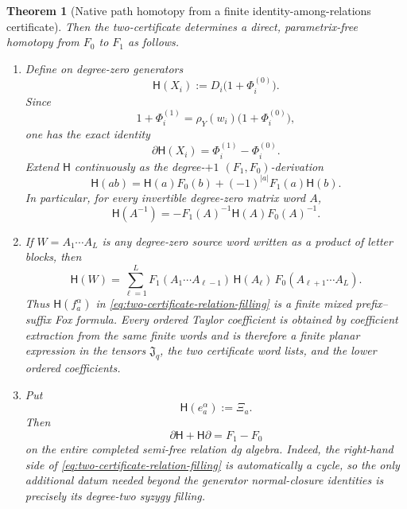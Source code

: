 \documentclass[11pt]{article}
\newtheorem{theorem}{Theorem}[section]
\theoremstyle{definition}
\begin{document}
\begin{theorem}[Native path homotopy from a finite identity-among-relations certificate]
Then the two-certificate determines a direct, parametrix-free homotopy from
$F_0$ to $F_1$ as follows.
\begin{enumerate}[label=\textnormal{(\roman*)}]
\item Define on degree-zero generators
\begin{equation}\label{eq:native-generator-homotopy}
 \boxed{
 \mathsf H(X_i):=D_i\bigl(1+\Phi_i^{(0)}\bigr).
 }
\end{equation}
Since
\[
 1+\Phi_i^{(1)}
 =\rho_Y(w_i)\bigl(1+\Phi_i^{(0)}\bigr),
\]
one has the exact identity
\begin{equation}\label{eq:native-generator-homotopy-boundary}
 \partial\mathsf H(X_i)=\Phi_i^{(1)}-\Phi_i^{(0)}.
\end{equation}
Extend $\mathsf H$ continuously as the degree-$+1$
$(F_1,F_0)$-derivation
\begin{equation}\label{eq:twisted-derivation-leibniz}
 \mathsf H(ab)
 =\mathsf H(a)F_0(b)+(-1)^{|a|}F_1(a)\mathsf H(b).
\end{equation}
In particular, for every invertible degree-zero matrix word $A$,
\begin{equation}\label{eq:twisted-derivation-inverse}
 \mathsf H(A^{-1})
 =-F_1(A)^{-1}\mathsf H(A)F_0(A)^{-1}.
\end{equation}

\item If $W=A_1\cdots A_L$ is any degree-zero source word written as a
product of letter blocks, then
\begin{equation}\label{eq:mixed-fox-homotopy-word}
 \boxed{
 \mathsf H(W)
 =\sum_{\ell=1}^{L}
 F_1(A_1\cdots A_{\ell-1})\,
 \mathsf H(A_\ell)\,
 F_0(A_{\ell+1}\cdots A_L).
 }
\end{equation}
Thus $\mathsf H(f_a^\alpha)$ in
\eqref{eq:two-certificate-relation-filling} is a finite mixed
prefix--suffix Fox formula.  Every ordered Taylor coefficient is obtained by
coefficient extraction from the same finite words and is therefore a finite
planar expression in the tensors $\mathfrak J_q$, the two certificate word
lists, and the lower ordered coefficients.

\item Put
\begin{equation}\label{eq:native-relation-homotopy}
 \mathsf H(e_a^\alpha):=\Xi_a.
\end{equation}
Then
\begin{equation}\label{eq:native-dga-homotopy}
 \boxed{
 \partial\mathsf H+\mathsf H\partial=F_1-F_0
 }
\end{equation}
on the entire completed semi-free relation dg algebra.
Indeed, the right-hand side of
\eqref{eq:two-certificate-relation-filling} is automatically a cycle, so the
only additional datum needed beyond the generator normal-closure identities
is precisely its degree-two syzygy filling.


\end{enumerate}
\end{theorem}
\end{document}
